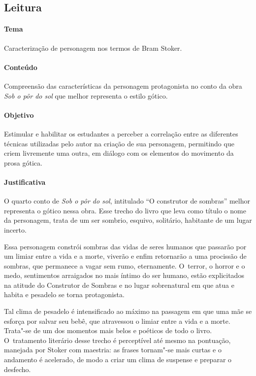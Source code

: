 \documentclass[12pt]{extarticle}
\begin{document}
\subsection{Leitura}  

\paragraph{Tema} Caracterização de personagem nos termos de Bram Stoker.

\paragraph{Conteúdo} Compreensão das características da personagem protagonista 
no conto da obra \emph{Sob o pôr do sol} que melhor representa o estilo gótico.  

\paragraph{Objetivo} Estimular e habilitar os estudantes a perceber a 
correlação entre as diferentes técnicas utilizadas pelo autor na criação de sua 
personagem, permitindo que criem livremente uma outra, em diálogo com os elementos 
do movimento da prosa gótica. 

\paragraph{Justificativa} O quarto conto de \textit{Sob o pôr do sol}, intitulado 
``O construtor de sombras'' melhor representa o gótico nessa obra. Esse trecho do livro 
que leva como título o nome da personagem, trata de um ser sombrio, esquivo, solitário, 
habitante de um lugar incerto. 

Essa personagem constrói sombras das vidas de seres humanos que passarão por um limiar entre 
a vida e  a morte, viverão e enfim retornarão a uma procissão de sombras, que permanece a 
vagar sem rumo, eternamente. O~terror, o horror e o medo, sentimentos arraigados
no mais íntimo do ser humano, estão explicitados na atitude do
Construtor de Sombras e no lugar sobrenatural em que atua e habita e pesadelo se
torna protagonista. 

Tal clima de pesadelo é intensificado ao máximo na
passagem em que uma mãe se esforça por salvar seu bebê, que atravessou o
limiar entre a vida e a morte. Trata"-se de um dos momentos mais belos e poéticos de todo 
o livro. O~tratamento literário desse trecho é perceptível até mesmo na pontuação, manejada
por Stoker com maestria: as frases tornam"-se mais curtas e o andamento é
acelerado, de modo a criar um clima de suspense e preparar o desfecho.
\end{document}
